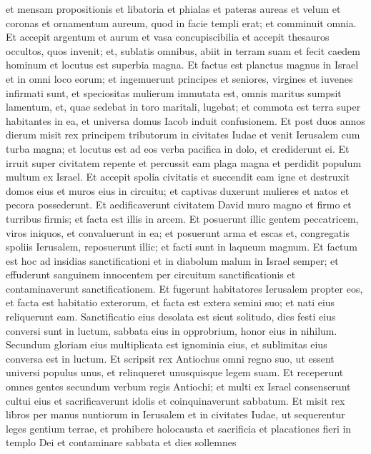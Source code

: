 \begin{biblechapter}
\verse et mensam propositionis et libatoria et phialas et pateras aureas et velum et coronas et ornamentum aureum, quod in facie templi erat; et comminuit omnia. 
 \verse Et accepit argentum et aurum et vasa concupiscibilia et accepit thesauros occultos, quos invenit; 
\verse et, sublatis omnibus, abiit in terram suam et fecit caedem hominum et locutus est superbia magna.
 \verse Et factus est planctus magnus in Israel et in omni loco eorum; 
\verse et ingemuerunt principes et seniores, virgines et iuvenes infirmati sunt, et speciositas mulierum immutata est, 
\verse omnis maritus sumpsit lamentum, et, quae sedebat in toro maritali, lugebat; 
\verse et commota est terra super habitantes in ea, et universa domus Iacob induit confusionem.
 \verse Et post duos annos dierum misit rex principem tributorum in civitates Iudae et venit Ierusalem cum turba magna; 
\verse et locutus est ad eos verba pacifica in dolo, et crediderunt ei. Et irruit super civitatem repente et percussit eam plaga magna et perdidit populum multum ex Israel. 
\verse Et accepit spolia civitatis et succendit eam igne et destruxit domos eius et muros eius in circuitu; 
\verse et captivas duxerunt mulieres et natos et pecora possederunt. 
 \verse Et aedificaverunt civitatem David muro magno et firmo et turribus firmis; et facta est illis in arcem. 
\verse Et posuerunt illic gentem peccatricem, viros iniquos, et convaluerunt in ea; 
\verse et posuerunt arma et escas et, congregatis spoliis Ierusalem, reposuerunt illic; et facti sunt in laqueum magnum. 
\verse Et factum est hoc ad insidias sanctificationi et in diabolum malum in Israel semper; 
\verse et effuderunt sanguinem innocentem per circuitum sanctificationis et contaminaverunt sanctificationem. 
\verse Et fugerunt habitatores Ierusalem propter eos, et facta est habitatio exterorum, et facta est extera semini suo; et nati eius reliquerunt eam. 
\verse Sanctificatio eius desolata est sicut solitudo, dies festi eius conversi sunt in luctum, sabbata eius in opprobrium, honor eius in nihilum. 
\verse Secundum gloriam eius multiplicata est ignominia eius, et sublimitas eius conversa est in luctum.
 \verse Et scripsit rex Antiochus omni regno suo, ut essent universi populus unus, 
 \verse et relinqueret unusquisque legem suam. Et receperunt omnes gentes secundum verbum regis Antiochi; 
\verse et multi ex Israel consenserunt cultui eius et sacrificaverunt idolis et coinquinaverunt sabbatum. 
\verse Et misit rex libros per manus nuntiorum in Ierusalem et in civitates Iudae, ut sequerentur leges gentium terrae, 
\verse et prohibere holocausta et sacrificia et placationes fieri in templo Dei et contaminare sabbata et dies sollemnes 

\end{biblechapter}
